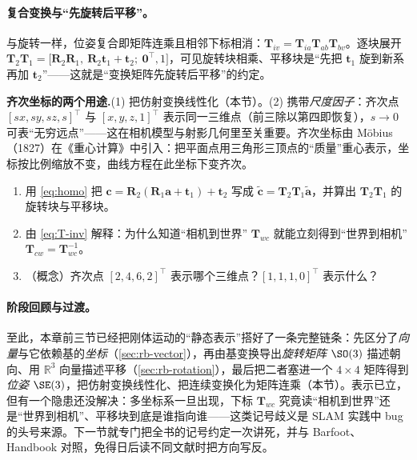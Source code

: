 \paragraph{复合变换与“先旋转后平移”。}与旋转一样，位姿复合即矩阵连乘且相邻下标相消：$\mathbf{T}_{iv}=\mathbf{T}_{ia}\mathbf{T}_{ab}\mathbf{T}_{bv}$。逐块展开 $\mathbf{T}_2\mathbf{T}_1=\big[\mathbf{R}_2\mathbf{R}_1,\ \mathbf{R}_2\mathbf{t}_1+\mathbf{t}_2;\ \mathbf{0}^\top,1\big]$，可见旋转块相乘、平移块是“先把 $\mathbf{t}_1$ 旋到新系再加 $\mathbf{t}_2$”——这就是“变换矩阵先旋转后平移”的约定\cite{barfoot2024state}。

\begin{note}
\textbf{齐次坐标的两个用途.}\;(1) 把仿射变换线性化（本节）。(2) 携带\emph{尺度因子}：齐次点 $[sx,sy,sz,s]^\top$ 与 $[x,y,z,1]^\top$ 表示同一三维点（前三除以第四即恢复），$s\to0$ 可表“无穷远点”——这在相机模型与射影几何里至关重要。齐次坐标由 Möbius（1827）在《重心计算》中引入：把平面点用三角形三顶点的“质量”重心表示，坐标按比例缩放不变，曲线方程在此坐标下变齐次\cite{barfoot2024state}。
\end{note}

\begin{practice}
\begin{enumerate}
  \item 用 \cref{eq:homo} 把 $\mathbf{c}=\mathbf{R}_2(\mathbf{R}_1\mathbf{a}+\mathbf{t}_1)+\mathbf{t}_2$ 写成 $\tilde{\mathbf{c}}=\mathbf{T}_2\mathbf{T}_1\tilde{\mathbf{a}}$，并算出 $\mathbf{T}_2\mathbf{T}_1$ 的旋转块与平移块。
  \item 由 \cref{eq:T-inv} 解释：为什么知道“相机到世界” $\mathbf{T}_{wc}$ 就能立刻得到“世界到相机” $\mathbf{T}_{cw}=\mathbf{T}_{wc}^{-1}$。
  \item （概念）齐次点 $[2,4,6,2]^\top$ 表示哪个三维点？$[1,1,1,0]^\top$ 表示什么？
\end{enumerate}
\end{practice}

\paragraph{阶段回顾与过渡。}至此，本章前三节已经把刚体运动的“静态表示”搭好了一条完整链条：先区分了\emph{向量}与它依赖基的\emph{坐标}（\cref{sec:rb-vector}），再由基变换导出\emph{旋转矩阵} $\SO(3)$ 描述朝向、用 $\mathbb{R}^3$ 向量描述平移（\cref{sec:rb-rotation}），最后把二者塞进一个 $4\times4$ 矩阵得到\emph{位姿} $\SE(3)$，把仿射变换线性化、把连续变换化为矩阵连乘（本节）。表示已立，但有一个隐患还没解决：多坐标系一旦出现，下标 $\mathbf{T}_{wc}$ 究竟读“相机到世界”还是“世界到相机”、平移块到底是谁指向谁——这类记号歧义是 SLAM 实践中 bug 的头号来源。下一节就专门把全书的记号约定一次讲死，并与 Barfoot、Handbook 对照，免得日后读不同文献时把方向写反。

